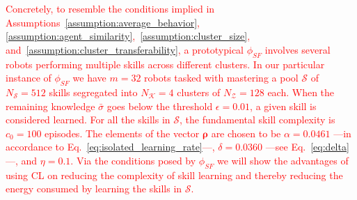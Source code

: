 \documentclass[12pt]{article}
\newcommand\myhl[1]{\textcolor{red}{#1}}
\begin{document}
\myhl{Concretely, to resemble the conditions implied in Assumptions~\ref{assumption:average_behavior}, \ref{assumption:agent_similarity},~\ref{assumption:cluster_size}, and~\ref{assumption:cluster_transferability}, a prototypical $\phi_{SF}$ involves several robots performing multiple skills across different clusters. In our particular instance of $\phi_{SF}$ we have $m=32$ robots tasked with mastering a pool $\mathcal{S}$ of $N_\mathcal{S}= 512$ skills segregated into $N_\mathcal{K}=4$ clusters of $N_\mathcal{Z} = 128$ each. When the remaining knowledge $\bar{\sigma}$ goes below the threshold $\epsilon = 0.01$, a given skill is considered learned. For all the skills in $\mathcal{S}$, the fundamental skill complexity is $c_0 = 100$ episodes. The elements of the vector $\bm{\rho}$ are chosen to be $\alpha =  0.0461$ ---in accordance to Eq.~\eqref{eq:isolated_learning_rate}---, $\delta =  0.0360$ ---see Eq.~\eqref{eq:delta}---, and $\eta= 0.1$. Via the conditions posed by $ \phi_{SF}$ we will show the advantages of using CL on reducing the complexity of skill learning and thereby reducing the energy consumed by learning the skills in $\mathcal{S} $.}

%
\end{document}
